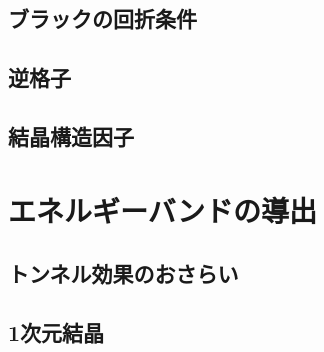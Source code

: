        \subsection{ブラックの回折条件}

        \subsection{逆格子}

        \subsection{結晶構造因子}


    \section{エネルギーバンドの導出}


        \subsection{トンネル効果のおさらい}

        \subsection{1次元結晶}

